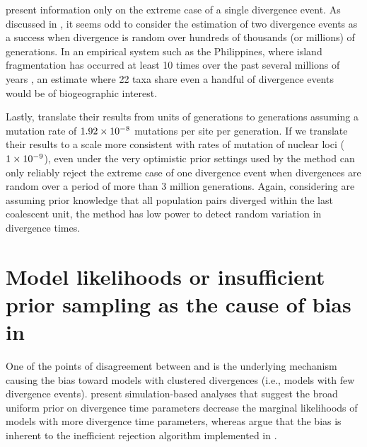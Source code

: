\documentclass[letterpaper,12pt]{article}
\begin{document}
\begin{linenumbers}
\citet{Hickerson2013} present information only on the extreme case of a
single divergence event.
As discussed in \citet{Oaks2012}, it seems odd to consider the estimation
of two divergence events as a success when divergence is random over hundreds
of thousands (or millions) of generations.
In an empirical system such as the Philippines, where island fragmentation has
occurred at least 10 times over the past several millions of years
\citep{Haq1987,Rohling1998,Siddall2003,Miller2005}, an estimate where 22 taxa
share even a handful of divergence events would be of biogeographic interest.

Lastly, \citet{Hickerson2013} translate their results from units of
\globalcoalunit generations to generations assuming a mutation rate of
$1.92\times 10^{-8}$ mutations per site per generation.
If we translate their results to a scale more consistent with rates of mutation
of nuclear loci ($1\times 10^{-9}$), even under the very optimistic prior settings used
by \citet{Hickerson2013} the method can only reliably reject the extreme case
of one divergence event when divergences are random over a period of more than
3 million generations.
Again, considering \citet{Hickerson2013} are assuming prior knowledge that
all population pairs diverged within the last coalescent unit, the
method has low power to detect random variation in divergence times.




\section*{Model likelihoods or insufficient prior sampling as the cause of bias
in \msb}
One of the points of disagreement between \citet{Hickerson2013} and
\citet{Oaks2012} is the underlying mechanism causing the bias toward models
with clustered divergences (i.e., models with few divergence events).
\citet{Oaks2012} present simulation-based analyses that suggest the broad
uniform prior on divergence time parameters decrease the marginal likelihoods
of models with more divergence time parameters, whereas \citet{Hickerson2013}
argue that the bias is inherent to the inefficient rejection algorithm
implemented in \msb.


\end{linenumbers}
\end{document}
